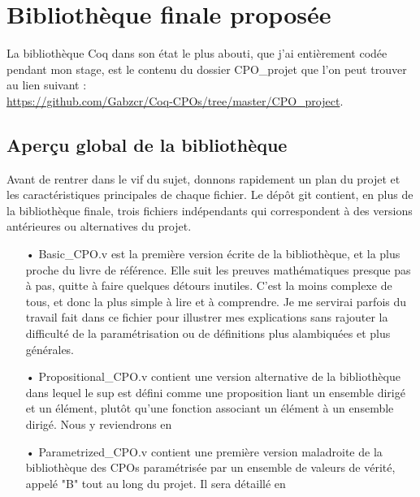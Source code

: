 \documentclass{article}
\newcommand\code[1]{{\fontfamily{lmtt}\selectfont #1}}
\theoremstyle{definition}
\begin{document}
\section{Bibliothèque finale proposée}

La bibliothèque Coq dans son état le plus abouti, que j'ai entièrement codée pendant mon stage, est le contenu du dossier \code{CPO\_projet} que l'on peut trouver au lien suivant :\\ \href{https://github.com/Gabzcr/Coq-CPOs/tree/master/CPO\_project}{https://github.com/Gabzcr/Coq-CPOs/tree/master/CPO\_project}.

\subsection{Aperçu global de la bibliothèque}

Avant de rentrer dans le vif du sujet, donnons rapidement un plan du projet et les caractéristiques principales de chaque fichier. Le dépôt git contient, en plus de la bibliothèque finale, trois fichiers indépendants qui correspondent à des versions antérieures ou alternatives du projet.

\medskip

\begin{itemize}
\item[•] \code{Basic\_CPO.v} est la première version écrite de la bibliothèque, et la plus proche du livre de référence. Elle suit les preuves mathématiques presque pas à pas, quitte à faire quelques détours inutiles. C'est la moins complexe de tous, et donc la plus simple à lire et à comprendre. Je me servirai parfois du travail fait dans ce fichier pour illustrer mes explications sans rajouter la difficulté de la paramétrisation ou de définitions plus alambiquées et plus générales.
\item[•] \code{Propositional\_CPO.v} contient une version alternative de la bibliothèque dans lequel le sup est défini comme une proposition liant un ensemble dirigé et un élément, plutôt qu'une fonction associant un élément à un ensemble dirigé. Nous y reviendrons en %
\item[•] \code{Parametrized\_CPO.v} contient une première version maladroite de la bibliothèque des CPOs paramétrisée par un ensemble de valeurs de vérité, appelé "B" tout au long du projet. Il sera détaillé en %
\end{itemize}

\medskip
\end{document}
